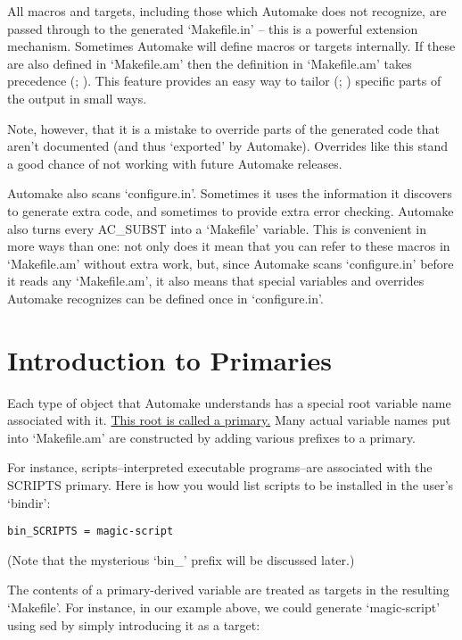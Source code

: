 All macros and targets, including those which Automake does not recognize, are 
passed through to the generated `Makefile.in' -- this is a powerful extension 
mechanism. Sometimes Automake will define macros or targets internally. If 
these are also defined in `Makefile.am' then the definition 
in `Makefile.am' takes precedence ({\MbQ{}}; {\McQ{}}).
This feature provides an easy way 
to tailor ({\MaQ{}}; {\MaQ{}}) specific parts of the output in small ways. 


Note, however, that it is a mistake to override parts of the generated code that aren't documented (and thus `exported' by Automake). Overrides like this stand a good chance of not working with future Automake releases. 


Automake also scans `configure.in'. Sometimes it uses the information it discovers to generate extra code, and sometimes to provide extra error checking. Automake also turns every AC\_{}SUBST into a `Makefile' variable. This is convenient in more ways than one: not only does it mean that you can refer to these macros in `Makefile.am' without extra work, but, since Automake scans `configure.in' before it reads any `Makefile.am', it also means that special variables and overrides Automake recognizes can be defined once in `configure.in'. 

\section{Introduction to Primaries}

Each type of object that Automake understands has a special root variable name 
associated with it. \underline{This root is called a primary.} Many actual
variable names put into `Makefile.am' are constructed by adding various 
prefixes to a primary. 


For instance, scripts--interpreted executable programs--are associated with the SCRIPTS primary. Here is how you would list scripts to be installed in the user's `bindir': 

\begin{Verbatim}[frame=single]
bin_SCRIPTS = magic-script
\end{Verbatim}

(Note that the mysterious `bin\_{}' prefix will be discussed later.) 


The contents of a primary-derived variable are treated as targets in the resulting `Makefile'. For instance, in our example above, we could generate `magic-script' using sed by simply introducing it as a target: 

